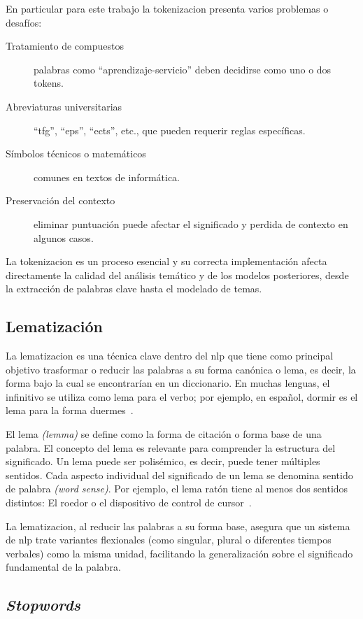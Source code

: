 En particular para este trabajo la \gls{tokenizacion} presenta varios problemas
o desafíos:
\begin{description}
	\item[Tratamiento de compuestos] palabras como “aprendizaje-servicio” deben decidirse
	      como uno o dos tokens.
	\item[Abreviaturas universitarias] “\acrshort{tfg}”, “\acrshort{eps}”,
	      “\acrshort{ects}”, etc., que pueden requerir reglas específicas.
	\item[Símbolos técnicos o matemáticos] comunes en textos de informática.
	\item[Preservación del contexto] eliminar puntuación puede afectar el significado y
	      perdida de contexto en algunos casos.
\end{description}

La \gls{tokenizacion} es un proceso esencial y su correcta implementación
afecta directamente la calidad del análisis temático y de los modelos
posteriores, desde la extracción de palabras clave hasta el modelado de temas.

\subsection{Lematización}
La \gls{lematizacion} es una técnica clave dentro del \acrshort{nlp} que tiene
como principal objetivo trasformar o reducir las palabras a su forma canónica o
lema, es decir, la forma bajo la cual se encontrarían en un diccionario. En
muchas lenguas, el infinitivo se utiliza como lema para el verbo; por ejemplo,
en español, dormir es el lema para la forma duermes~\cite{jm3}.

El lema \textit{(lemma)} se define como la forma de citación o forma base de
una palabra. El concepto del lema es relevante para comprender la estructura
del significado. Un lema puede ser polisémico, es decir, puede tener múltiples
sentidos. Cada aspecto individual del significado de un lema se denomina
sentido de palabra \textit{(word sense)}. Por ejemplo, el lema ratón tiene al
menos dos sentidos distintos: El roedor o el dispositivo de control de
cursor~\cite{jm3}.

La \gls{lematizacion}, al reducir las palabras a su forma base, asegura que un
sistema de \acrshort{nlp} trate variantes flexionales (como singular, plural o
diferentes tiempos verbales) como la misma unidad, facilitando la
generalización sobre el significado fundamental de la palabra.

\subsection{\textit{Stopwords}}

